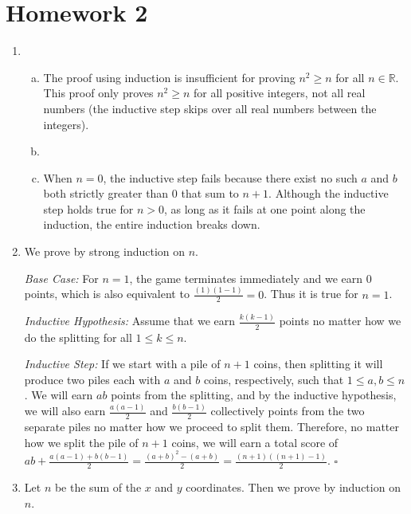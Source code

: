 \section{Homework 2}
\begin{enumerate}
    \setlength{\parskip}{10pt}
    \item\begin{enumerate}[(a)]
        \item {} The proof using induction is insufficient for proving $n^2\geq n$ for all $n\in\mathbb{R}$. This proof only proves $n^2\geq n$ for all positive integers, not all real numbers (the inductive step skips over all real numbers between the integers).
        \item {}
        \item {} When $n=0$, the inductive step fails because there exist no such $a$ and $b$ both strictly greater than 0 that sum to $n+1$. Although the inductive step holds true for $n>0$, as long as it fails at one point along the induction, the entire induction breaks down.
    \end{enumerate}
    
    \item We prove by strong induction on $n$.
    
        \textit{Base Case:} For $n=1$, the game terminates immediately and we earn 0 points, which is also equivalent to $\frac{(1)(1-1)}{2}=0$. Thus it is true for $n=1$.
        
        \textit{Inductive Hypothesis:} Assume that we earn $\frac{k(k-1)}{2}$ points no matter how we do the splitting for all $1\leq k\leq n$.
        
        \textit{Inductive Step:} If we start with a pile of $n+1$ coins, then splitting it will produce two piles each with $a$ and $b$ coins, respectively, such that $1\leq a, b\leq n$. We will earn $ab$ points from the splitting, and by the inductive hypothesis, we will also earn $\frac{a(a-1)}{2}$ and $\frac{b(b-1)}{2}$ collectively points from the two separate piles no matter how we proceed to split them. Therefore, no matter how we split the pile of $n+1$ coins, we will earn a total score of $ab+\frac{a(a-1)+b(b-1)}{2}=\frac{(a+b)^2-(a+b)}{2}=\frac{(n+1)((n+1)-1)}{2}$. $\square$

    \item Let $n$ be the sum of the $x$ and $y$ coordinates. Then we prove by induction on $n$.
    

\end{enumerate}
